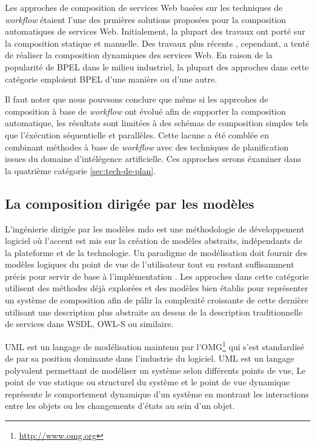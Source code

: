   Les approches de composition de services Web basées sur les
  techniques de \textit{workflow} étaient l'une des prmières solutions
  proposées pour la composition automatiques de services
  Web. Initialement, la plupart des travaux ont porté sur la
  composition statique et manuelle. Des travaux plus récents
  \cite{majithia2004framework, ardagna2007paws, fujii2006semantics,
    fujii2009semantics}, cependant, a tenté de réaliser la composition
  dynamiques des services Web. En raison de la popularité de
  \textsc{BPEL} dans le milieu industriel, la plupart des approches
  dans cette catégorie emploient \textsc{BPEL} d'une manière ou d'une
  autre.\medskip

  Il faut noter que nous pouvsons conclure que même si les apprcohes
  de composition à base de \textit{workflow} ont évolué afin de
  supporter la composition automatique, les résultats sont limitées à
  des schémas de composition simples tels que l'éxécution séquentielle
  et parallèles. Cette lacune a été comblée en combinant méthodes à
  base de \textit{workflow} avec des techniques de planification
  issues du domaine d'intélégence artificielle. Ces approches serons
  éxaminer dans la quatrième catégorie \ref{sec:tech-de-plan}.

  \subsection{La composition dirigée par les modèles}
  \label{sec:model-based-composition}
  L'ingénierie dirigée par les modèles \acrshort{mdo} est une
  méthodologie de développement logiciel où l'accent est mis sur la
  création de modèles abstraits, indépendants de la plateforme et de
  la technologie. Un paradigme de modélisation doit fournir des
  modèles logiques du point de vue de l'utilisateur tout en restant
  suffisamment précis pour servir de base à l'implémentation
  \cite{dumez2010approche}. Les approches dans cette catégorie
  utilisent des méthodes déjà explorées et des modèles bien établis
  pour représenter un système de composition afin de pâlir la
  complexité croissante de cette dernière utilisant une description
  plus abstraite au dessus de la description traditionnelle de
  services dans \textsc{WSDL}, \textsc{OWL-S} ou similaire.\medskip

  \textsc{UML} \cite{rumbaugh2004unified} est un langage de
  modélisation maintenu par
  l'\textsc{OMG}\footnote{\url{http://www.omg.org}} qui s'est
  standardisé de par sa position dominante dans l'industrie du
  logiciel. \textsc{UML} est un langage polyvalent permettant de
  modéliser un système selon différents points de vue, Le point de vue
  statique ou structurel du système et le point de vue dynamique
  représente le comportement dynamique d'un système en montrant les
  interactions entre les objets ou les changements d'états au sein
  d'un objet.\medskip

